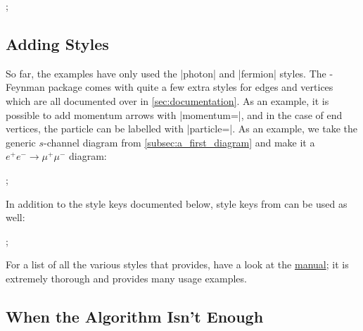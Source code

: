 \documentclass[a4paper,final]{ltxdoc}
\providecommand{\tikzfeynmanname}{\tikzname-Feynman}
\providecommand{\pgfmanual}{\href{http://mirrors.ctan.org/graphics/pgf/base/doc/pgfmanual.pdf}{\tikzname{} manual}}
\begin{document}
\begin{codeexample}[]
;
\end{codeexample}

\subsection{Adding Styles}
\label{subsec:adding_styles}

So far, the examples have only used the |photon| and |fermion| styles.  The
\tikzfeynmanname{} package comes with quite a few extra styles for edges and
vertices which are all documented over in \cref{sec:documentation}.  As an
example, it is possible to add momentum arrows with |momentum=|, and
in the case of end vertices, the particle can be labelled with
|particle=|.  As an example, we take the generic \(s\)-channel
diagram from \cref{subsec:a_first_diagram} and make it a \(e^{+}e^{-} \to
\mu^{+}\mu^{-}\) diagram:
\begin{codeexample}[]
;
\end{codeexample}
In addition to the style keys documented below, style keys from \tikzname{} can
be used as well:
\begin{codeexample}[]
;
\end{codeexample}
For a list of all the various styles that \tikzname{} provides, have a look at
the \pgfmanual; it is extremely thorough and provides many usage examples.

\subsection{When the Algorithm Isn't Enough}
\label{subsec:when_the_algorithm_isnt_enough}
\end{document}
